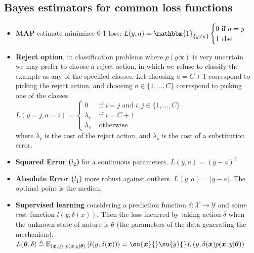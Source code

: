 \subsection{Bayes estimators for common loss functions}
\begin{itemize}
    \item \textbf{MAP} estimate minimizes 0-1 loss: $L(y, a) = \mathbbm{1}_{\{y\neq a\}}
		\begin{cases}
			0 \text{ if } a = y\\
			1 \text{ else}
		\end{cases}$
    \item \textbf{Reject option}, in classification problems where $p(y|\bm{x})$ is very 
		uncertain we may prefer to choose a reject action, in which we refuse to 
		classify the example as any of the specified classes. Let choosing $a=C+1$
		correspond to picking the reject action, and choosing $a\in\{1,...,C\}$
		correspond to picking one of the classes.\\
		$L(y=j, a=i) = 
		\begin{cases}
			0 &\text{ if } i=j \text{ and } i,j\in\{1,...,C\}\\
			\lambda_{r} &\text{ if } i=C+1 \\
			\lambda_{s} &\text{ otherwise}
		\end{cases} $\\
		where $\lambda_{r}$ is the cost of the reject action, and $\lambda_{s}$ is
		the cost of a substitution error. 
    \item \textbf{Squared Error ($l_{2}$)} for a continuous parameters. $L(y, a) =
        (y-a)^{2}$
    \item \textbf{Absolute Error ($l_{1}$)} more robust against outliers. $L(y,a)=
		\lvert y-a\rvert$. The optimal point is the median.
    \item \textbf{Supervised learning} considering a prediction function $\delta: 
        \mathcal{X} \rightarrow \mathcal{Y}$ and some cost function $l(y, \delta(x))$. 
        Then the loss incurred by taking action $\delta$ when the unknown state of nature
        is $\theta$ (the parameters of the data generating the mechanism).
        $L(\bm{\theta}, \delta) \triangleq 
        \mathbb{E}_{(\bm{x}, y)~p(\bm{x},y|\bm{\theta})}\left(
        l(y, \delta(\bm{x}))\right)=\su{\bm{x}}{}\su{y}{}L\left(y,\delta(\bm{x}) 
        p(\bm{x},y|\bm{\theta})\right)$
\end{itemize}


